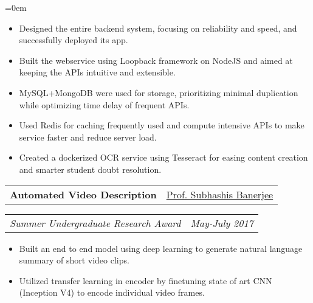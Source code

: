 \documentclass{article}
\makeatletter
\newcommand{\headerrow}[2]
{\begin{tabular*}{\linewidth}{l@{\extracolsep{\fill}}r}
	#1 &
	#2 \\
\end{tabular*}}
\makeatother
\begin{document}
\begin{list} {}{\leftmargin=0em}
\begin{itemize}
    \setlength\itemsep{0.0em}
    \item Designed the entire backend system, focusing on reliability and speed, and successfully deployed its app.
	\item Built the webservice using Loopback framework on NodeJS and aimed at keeping the APIs intuitive and extensible.
	\item MySQL+MongoDB were used for storage, prioritizing minimal duplication while optimizing time delay of frequent APIs.
	\item Used Redis for caching frequently used and compute intensive APIs to make service faster and reduce server load.
    \item Created a dockerized OCR service using Tesseract for easing content creation and smarter student doubt resolution.
    \end{itemize}
    \item[]
    \headerrow {\textbf{Automated Video Description}}{\underline{Prof. Subhashis Banerjee}}
    \headerrow {\emph{Summer Undergraduate Research Award}}{\emph{May-July 2017}}
    \begin{itemize}
    \setlength\itemsep{0.0em}
        \item Built an end to end model using deep learning to generate natural language summary of short video clips.
        \item Utilized transfer learning in encoder by finetuning state of art CNN (Inception V4) to encode individual video frames.

\end{itemize}
\end{list}
\end{document}
